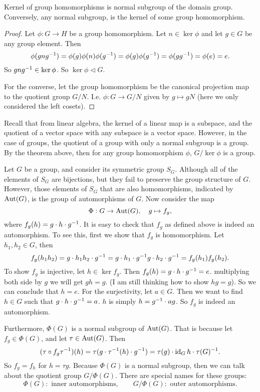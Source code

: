 \begin{theorem}
	Kernel of group homomorphisms is normal subgroup of the domain group. Conversely, any normal subgroup, is the kernel of some group homomorphism.
\end{theorem}
\begin{proof}
	Let $ \phi: G\to H $ be a group homomorphism. Let $ n \in \ker \phi $ and let $ g\in G $ be any group element. Then
	\[ \phi(gng^{-1}) = \phi(g) \phi(n) \phi(g^{-1}) = \phi(g) \phi(g^{-1}) = \phi(gg^{-1}) = \phi(e) = e. \]
	So $ gng^{-1} \in \ker \phi $. So $ \ker \phi \lhd G $.
	
	For the converse, let the group homomorphism be the canonical projection map to the quotient group $ G/N $. I.e. $ \phi: G\to G/N $ given by $ g \mapsto gN $ (here we only considered the left cosets).
\end{proof}
\begin{remark}
	Recall that from linear algebra, the kernel of a linear map is a subspace, and the quotient of a vector space with any subspace is a vector space. However, in the case of groups, the quotient of a group with only a normal subgroup is a group. By the theorem above, then for any group homomorphism $ \phi $, $ G/\ker \phi $ is a group.
\end{remark}


\begin{summary}
	Let $ G $ be a group, and consider its symmetric group $ S_G $. Although all of the elements of $ S_G $ are bijections, but they fail to preserve the group structure of $ G $. However, those elements of $ S_G $ that are also homomorphisms, indicated by $ \operatorname{Aut}(G) $, is the group of automorphisms of $ G $. Now consider the map
	\[ \Phi: G \to \operatorname{Aut}(G), \quad g \mapsto f_g, \]
	where $ f_g(h) = g\cdot h\cdot g^{-1} $. It is easy to check that $ f_g $ as defined above is indeed an automorphism. To see this, first we show that $ f_g $ is homomorphism. Let $ h_1,h_2\in G $, then 
	\[ f_g(h_1h_2) = g\cdot h_1h_2 \cdot g^{-1} = g\cdot h_1\cdot g^{-1} g \cdot h_2\cdot g^{-1} = f_g(h_1) f_g(h_2).  \]
	To show $ f_g $ is injective, let $ h \in \ker f_g $. Then $ f_g(h) = g\cdot h \cdot g^{-1} = e $. multiplying both side by $ g $ we will get $ gh = g $. (I am still thinking how to show $ hg = g $). So we can conclude that $ h =e $. For the surjectivity, let $ a\in G $. Then we want to find $ h\in G $ such that $ g\cdot h \cdot g^{-1} = a $. $ h $ is simply $ h = g^{-1}\cdot a g $. So $ f_g $ is indeed an automorphism.
	
	Furthermore, $ \Phi(G) $ is a normal subgroup of $ \operatorname{Aut}(G) $. That is because let $ f_g \in \Phi(G)$, and let $ \tau \in \operatorname{Aut}(G) $. Then
	\[( \tau\circ f_g \tau^{-1})(h) = \tau(g\cdot \tau^{-1}(h)\cdot g^{-1}) = \tau(g) \cdot \operatorname{id}_G h \cdot \tau(G)^{-1}.  \]
	So $ f_g = f_h $ for $ h = \tau g $. Because $ \Phi(G) $ is a normal subgroup, then we can talk about the quotient group $ G/\Phi(G) $. There are special names for these groups:
	\[ \Phi(G):\text{ inner automorphisms}, \qquad G/\Phi(G):\text{ outer automorphisms}. \]
\end{summary}

